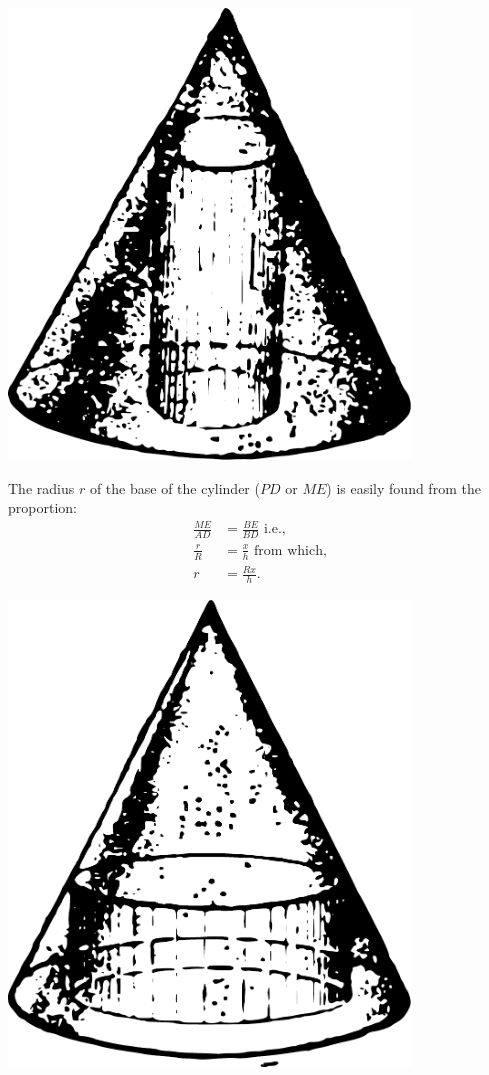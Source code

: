 \begin{marginfigure}[-7cm]%
\centering
\includegraphics[width=0.8\textwidth]{figures/ch-12/fig-186.pdf}
\end{marginfigure}
The radius \( r \) of the base of the cylinder ($PD$ or $ME$) is easily found from the proportion:
\begin{align*}%
\frac{ME}{AD} & = \frac{BE}{BD} \,\, \text{i.e.,}\\
\frac{r}{R} & = \frac{x}{h} \,\, \text{from which,}\\
 r & = \frac{Rx}{h}.
\end{align*}
\begin{marginfigure}[-4cm]%
\centering
\includegraphics[width=0.8\textwidth]{figures/ch-12/fig-187.pdf}
\end{marginfigure}
